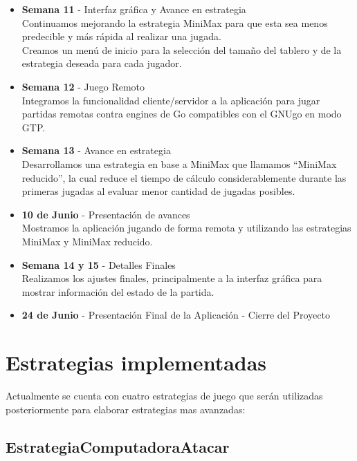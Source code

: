 \documentclass[11pt]{article}
\begin{document}
\begin{itemize}
  \item \textbf{Semana 11} - Interfaz gr\'afica y Avance en estrategia\\
	Continuamos mejorando la estrategia MiniMax para que esta sea menos predecible y m\'as r\'apida al realizar una jugada.\\
	Creamos un men\'u de inicio para la selecci\'on del tama\~no del tablero y de la estrategia deseada para cada jugador.
  
  \item \textbf{Semana 12} - Juego Remoto\\
	Integramos la funcionalidad cliente/servidor a la aplicaci\'on para jugar partidas remotas contra engines de Go compatibles con
	el GNUgo en modo GTP.
  
  \item \textbf{Semana 13} - Avance en estrategia\\
	Desarrollamos una estrategia en base a MiniMax que llamamos ``MiniMax reducido'', la cual reduce el tiempo de c\'alculo considerablemente 
	durante las primeras jugadas al evaluar menor cantidad de jugadas posibles.

  \item \textbf{10 de Junio} - Presentaci\'on de avances\\
	Mostramos la aplicaci\'on jugando de forma remota y utilizando las estrategias MiniMax y MiniMax reducido.

  \item \textbf{Semana 14 y 15} - Detalles Finales\\
	Realizamos los ajustes finales, principalmente a la interfaz gr\'afica para mostrar informaci\'on del estado de la partida.
  
  \item \textbf{24 de Junio} - Presentaci\'on Final de la Aplicaci\'on - Cierre del Proyecto\\

\end{itemize}


\newpage

\section{Estrategias implementadas}
\label{sec-4.3}

   Actualmente se cuenta con cuatro estrategias de juego que serán
   utilizadas posteriormente para elaborar estrategias mas avanzadas:
\subsection{EstrategiaComputadoraAtacar}
\label{sec-4.3.1}
\end{document}

